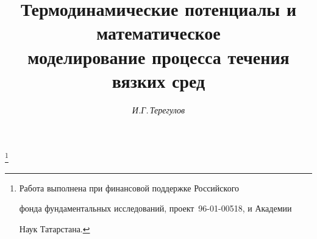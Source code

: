 







\newcommand{\tts}[1]{}










\setcounter{page}{72}












\author{\it И.Г.\,Терегулов}


\title{Термодинамические потенциалы и математическое\\


моделирование процесса течения вязких сред}





\thanks{Работа выполнена при финансовой поддержке Российского


фонда фундаментальных исследований, проект \No\,96-01-00518, и Академии


Наук Татарстана.}


\date{}







\pagestyle{plain} %













